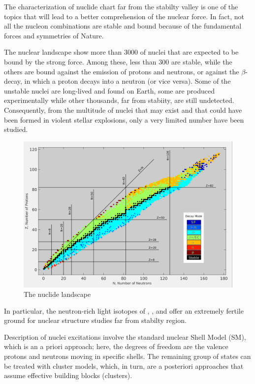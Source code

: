 The characterization of nuclide chart far from the stabilty valley is one of the
topics that will lead to a better comprehension of the nuclear force. In fact,
not all the nucleon combinations are stable and bound because of the
fundamental forces and symmetries of Nature.


\bigbreak

The nuclear landscape show more than $3000$ of nuclei that are expected to be
bound by the strong force. Among these, less than $300$ are stable, while the
others are bound against the emission of protons and neutrons, or against the
$\beta$-decay, in which a proton decays into a neutron (or vice versa). Some
of the unstable nuclei are long-lived and found on Earth, some are produced
experimentally while other thousands, far from stabiity, are still undetected.
Consequently, from the multitude of nuclei that may exist and that could have
been formed in violent stellar explosions, only a very limited number
have been studied.

\bigbreak

\begin{figure}[h]
  \centering
  \includegraphics[scale=.35]{img/DecayModeNuDat2.png}
  \caption{The nuclide landscape}
  \label{nucl}
\end{figure}

\bigbreak

In particular, the neutron-rich light isotopes of , ,  and
 offer an extremely fertile ground for nuclear structure studies far
from stabilty region.

Description of nuclei excitations involve the standard nuclear
Shell Model (SM), which is an a priori approach; here, the degrees of freedom
are the valence protons and neutrons moving in specific shells.
The remaining group of states can be treated with cluster models, which, in
turn, are a posteriori approaches that assume effective building blocks
(clusters).

